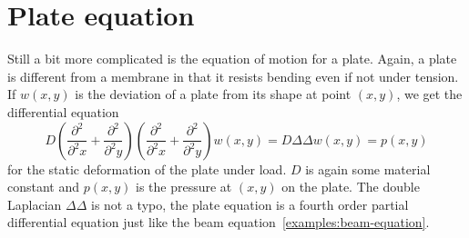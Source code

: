 %
%
%
\section{Plate equation}
Still a bit more complicated is the equation of motion for a plate.
Again, a plate is different from a membrane in that it resists bending
even if not under tension.
If $w(x,y)$ is the deviation of a plate from its shape at point $(x,y)$,
we get the differential equation
\[
D\left(
\frac{\partial^2}{\partial^2 x}
+
\frac{\partial^2}{\partial^2 y}
\right)
\left(
\frac{\partial^2}{\partial^2 x}
+
\frac{\partial^2}{\partial^2 y}
\right)
w(x,y)
=D\Delta\Delta w(x,y)
=p(x,y)
\]
for the static deformation of the plate under load.
$D$ is again some material constant and $p(x,y)$ is the pressure at
$(x,y)$ on the plate.
The double Laplacian $\Delta\Delta$ is not a typo, the plate equation
is a fourth order partial differential equation just like the beam
equation~\eqref{examples:beam-equation}.


